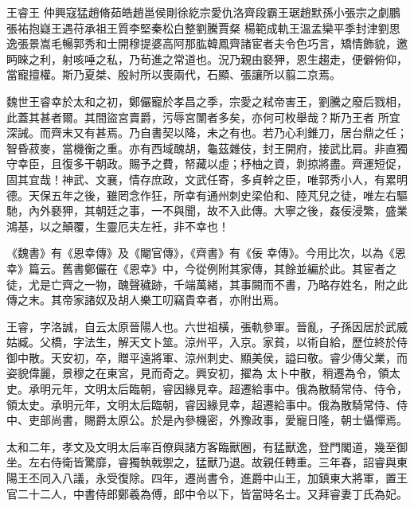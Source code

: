 
\begin{pinyinscope}

 王睿王
 仲興寇猛趙脩茹皓趙邕侯剛徐紇宗愛仇洛齊段霸王琚趙默孫小張宗之劇鵬張祐抱嶷王遇苻承祖王質李堅秦松白整劉騰賈粲
 楊範成軌王溫孟欒平季封津劉思逸張景嵩毛暢郭秀和士開穆提婆高阿那肱韓鳳齊諸宦者夫令色巧言，矯情飾貌，邀眄睞之利，射咳唾之私，乃茍進之常道也。況乃親由褻狎，恩生趨走，便僻俯仰，當寵擅權。斯乃夏桀、殷紂所以喪兩代，石顯、張讓所以翦二京焉。



 魏世王睿幸於太和之初，鄭儼寵於孝昌之季，宗愛之弒帝害王，劉騰之廢后戮相，此蓋其甚者爾。其間盜宮賣爵，污辱宮闈者多矣，亦何可枚舉哉？斯乃王者
 所宜深誡。而齊末又有甚焉。乃自書契以降，未之有也。若乃心利錐刀，居台鼎之任；智昏菽麥，當機衡之重。亦有西域醜胡，龜茲雜伎，封王開府，接武比肩。非直獨守幸臣，且復多干朝政。賜予之費，帑藏以虛；杼柚之資，剝掠將盡。齊運短促，固其宜哉！神武、文襄，情存庶政，文武任寄，多貞幹之臣，唯郭秀小人，有累明德。天保五年之後，雖罔念作狂，所幸有通州刺史梁伯和、陸芃兒之徒，唯左右驅馳，內外褻狎，其朝廷之事，一不與聞，故不入此傳。大寧之後，姦佞浸繁，盛業鴻基，以之顛覆，生靈厄夫左衽，非不幸也！



 《魏書》有《恩幸傳》及《閹官傳》，《齊書》有《佞
 幸傳》。今用比次，以為《恩幸》篇云。舊書鄭儼在《恩幸》中，今從例附其家傳，其餘並編於此。其宦者之徒，尤是亡齊之一物，醜聲穢跡，千端萬緒，其事闕而不書，乃略存姓名，附之此傳之末。其帝家諸奴及胡人樂工叨竊貴幸者，亦附出焉。



 王睿，字洛誠，自云太原晉陽人也。六世祖橫，張軌參軍。晉亂，子孫因居於武威姑臧。父橋，字法生，解天文卜筮。涼州平，入京。家貧，以術自給，歷位終於侍御中散。天安初，卒，贈平遠將軍、涼州刺史、顯美侯，謚曰敬。睿少傳父業，而姿貌偉麗，景穆之在東宮，見而奇之。興安初，擢為
 太卜中散，稍遷為令，領太史。承明元年，文明太后臨朝，睿因緣見幸。超遷給事中。俄為散騎常侍、侍令，領太史。承明元年，文明太后臨朝，睿因緣見幸，超遷給事中。俄為散騎常侍、侍中、吏部尚書，賜爵太原公。於是內參機密，外豫政事，愛寵日隆，朝士懾憚焉。



 太和二年，孝文及文明太后率百僚與諸方客臨獸圈，有猛獸逸，登門閣道，幾至御坐。左右侍衛皆驚靡，睿獨執戟禦之，猛獸乃退。故親任轉重。三年春，詔睿與東陽王丕同入八議，永受復除。四年，遷尚書令，進爵中山王，加鎮東大將軍，置王官二十二人，中書侍郎鄭羲為傅，郎中令以下，皆當時名士。又拜睿妻丁氏為妃。




\end{pinyinscope}
